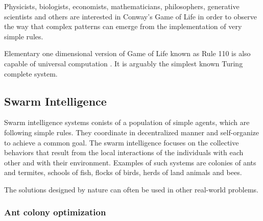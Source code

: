 Physicists, biologists, economists, mathematicians, philosophers, generative scientists and others are interested in Conway’s Game of Life in order to observe the way that complex patterns can emerge from the implementation of very simple rules.

Elementary one dimensional version of Game of Life known as Rule 110 is also capable of universal computation \cite{Cook04LifeOneDimensionalUniversal}. It is arguably the simplest known Turing complete system.


\subsection{Swarm Intelligence} %
\label{sub:swarm_intelligence}

Swarm intelligence  systems conists of a population of simple agents, which are following simple rules. They coordinate in decentralized manner and self-organize to achieve a common goal. The swarm intelligence focuses on the collective behaviors that result from the local interactions of the individuals with each other and with their environment. Examples of such systems are colonies of ants and termites, schools of fish, flocks of birds, herds of land animals and bees.

The solutions designed by nature can often be used in other real-world problems.

\subsubsection{Ant colony optimization} %
\label{ssub:ant_colony_optimization}

